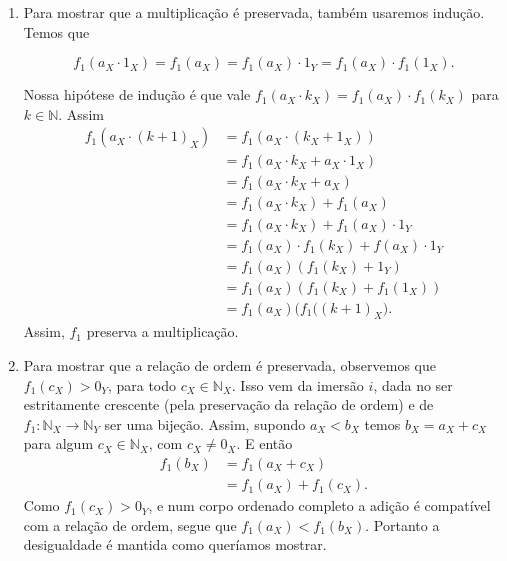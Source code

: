 \documentclass[../main.tex]{subfiles}
\begin{document}
\begin{dem}
\begin{enumerate}
\begin{enumerate}
            \item
                Para mostrar que a multiplicação é preservada, também usaremos indução.
                Temos que
                
                \[ f_1(a_X \cdot 1_X) = f_1(a_X) = f_1(a_X) \cdot 1_Y = f_1(a_X) \cdot f_1(1_X). \]
        
                Nossa hipótese de indução é que vale $f_1(a_X \cdot k_X) = f_1(a_X) \cdot f_1(k_X)$ para $k \in \mathbb{N}$. Assim
                \begin{align*}
                    f_1(a_X \cdot (k+1)_X)
                    &= f_1(a_X \cdot (k_X + 1_X))\\
                    &= f_1(a_X \cdot k_X + a_X \cdot 1_X) \\
                    &= f_1(a_X \cdot k_X + a_X) \\
                    &= f_1(a_X \cdot k_X) + f_1(a_X) \\
                    &= f_1(a_X \cdot k_X) + f_1(a_X) \cdot 1_Y \\
                    &= f_1(a_X) \cdot f_1(k_X) + f(a_X) \cdot 1_Y \\
                    &= f_1(a_X) (f_1(k_X) + 1_Y) \\
                    &= f_1(a_X) (f_1(k_X) + f_1(1_X)) \\
                    &= f_1(a_X) \big( f_1((k+1)_X \big).
                \end{align*}
                Assim, $f_1$ preserva a multiplicação.

            \item Para mostrar que a relação de ordem é preservada, observemos que \\ 
            $f_1(c_X) > 0_Y$, para todo $c_X \in \mathbb{N}_X$. Isso vem da imersão $i$, dada no  ser estritamente crescente (pela preservação da relação de ordem) e de \\ $f_1 \colon \mathbb{N}_X \to \mathbb{N}_Y$ ser uma bijeção. Assim, supondo $a_X < b_X$ temos $b_X = a_X+c_X$ para algum $c_X \in \mathbb{N}_X$, com $c_X \neq 0_X$. E então
            \begin{align*}
                f_1(b_X) 
                &= f_1(a_X + c_X)\\
                &= f_1(a_X) + f_1(c_X).
            \end{align*}
            Como $f_1(c_X) > 0_Y$, e num corpo ordenado completo a adição é compatível com a relação de ordem, segue que $f_1(a_X) < f_1(b_X)$.
            Portanto a desigualdade é mantida como queríamos mostrar.            
        \end{enumerate}
    

\end{enumerate}
\end{dem}
\end{document}

